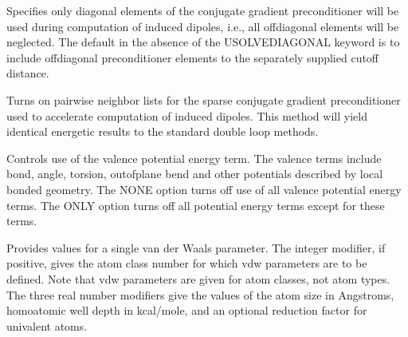 \documentclass[letterpaper,11pt,english]{sphinxmanual}
\begin{document}
\ignorespaces {}\label{\detokenize{text/keywords:key-usolve-diagonal}}\begin{description}
\sphinxAtStartPar
Specifies only diagonal elements of the conjugate gradient preconditioner will be used during computation of induced dipoles, i.e., all off\sphinxhyphen{}diagonal elements will be neglected. The default in the absence of the USOLVE\sphinxhyphen{}DIAGONAL keyword is to include off\sphinxhyphen{}diagonal preconditioner elements to the separately supplied cutoff distance.

\end{description}

\ignorespaces {}\label{\detokenize{text/keywords:key-usolve-list}}\begin{description}
\sphinxAtStartPar
Turns on pairwise neighbor lists for the sparse conjugate gradient preconditioner used to accelerate computation of induced dipoles. This method will yield identical energetic results to the standard double loop methods.

\end{description}

\ignorespaces {}\label{\detokenize{text/keywords:key-valenceterm}}\begin{description}
\sphinxAtStartPar
Controls use of the valence potential energy term. The valence terms include bond, angle, torsion, out\sphinxhyphen{}of\sphinxhyphen{}plane bend and other potentials described by local bonded geometry. The NONE option turns off use of all valence potential energy terms. The ONLY option turns off all potential energy terms except for these terms.

\end{description}

\ignorespaces {}\label{\detokenize{text/keywords:key-vdw}}\begin{description}
\sphinxAtStartPar
Provides values for a single van der Waals parameter. The integer modifier, if positive, gives the atom class number for which vdw parameters are to be defined. Note that vdw parameters are given for atom classes, not atom types. The three real number modifiers give the values of the atom size in Angstroms, homoatomic well depth in kcal/mole, and an optional reduction factor for univalent atoms.

\end{description}
\end{document}
